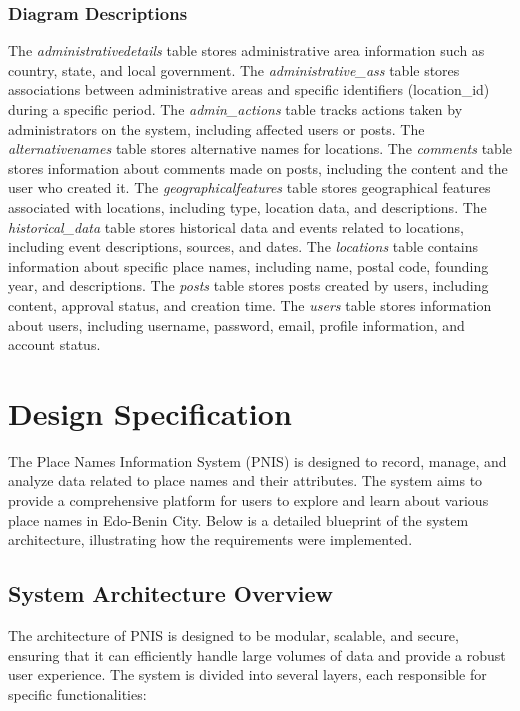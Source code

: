 \subsubsection{Diagram Descriptions}
The \textit{administrativedetails} table stores administrative area information such as country, state, and local government. The \textit{administrative\_ass} table stores associations between administrative areas and specific identifiers (location\_id) during a specific period. The \textit{admin\_actions} table tracks actions taken by administrators on the system, including affected users or posts. The \textit{alternativenames} table stores alternative names for locations. The \textit{comments} table stores information about comments made on posts, including the content and the user who created it. The \textit{geographicalfeatures} table stores geographical features associated with locations, including type, location data, and descriptions. The \textit{historical\_data} table stores historical data and events related to locations, including event descriptions, sources, and dates. The \textit{locations} table contains information about specific place names, including name, postal code, founding year, and descriptions. The \textit{posts} table stores posts created by users, including content, approval status, and creation time. The \textit{users} table stores information about users, including username, password, email, profile information, and account status.

\section{Design Specification}
The Place Names Information System (PNIS) is designed to record, manage, and analyze data related to place names and their attributes. The system aims to provide a comprehensive platform for users to explore and learn about various place names in Edo-Benin City. Below is a detailed blueprint of the system architecture, illustrating how the requirements were implemented.

\subsection{System Architecture Overview}
The architecture of PNIS is designed to be modular, scalable, and secure, ensuring that it can efficiently handle large volumes of data and provide a robust user experience. The system is divided into several layers, each responsible for specific functionalities:

